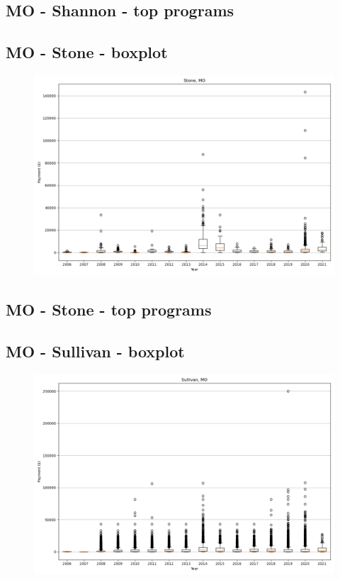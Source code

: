 \subsection*{MO - Shannon - top programs}

\newpage
\subsection*{MO - Stone - boxplot}
\begin{figure}[h]
\centering
\includegraphics[width=7in]{../output/boxplots/counties/Stone-MO_boxplot.png}
\end{figure}


\subsection*{MO - Stone - top programs}

\newpage
\subsection*{MO - Sullivan - boxplot}
\begin{figure}[h]
\centering
\includegraphics[width=7in]{../output/boxplots/counties/Sullivan-MO_boxplot.png}
\end{figure}


